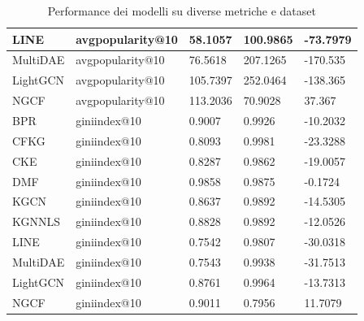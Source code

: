 \begin{table}[H]
\begin{tabular}{|l|l|l|l|l|}
    LINE             & avgpopularity@10 & 58.1057                       & 100.9865                        & -73.7979                              \\ \hline
    MultiDAE         & avgpopularity@10 & 76.5618                       & 207.1265                        & -170.535                              \\ \hline
    LightGCN         & avgpopularity@10 & 105.7397                      & 252.0464                        & -138.365                              \\ \hline
    NGCF             & avgpopularity@10 & 113.2036                      & 70.9028                         & 37.367                                \\ \hline
    BPR              & giniindex@10     & 0.9007                        & 0.9926                          & -10.2032                              \\ \hline
    CFKG             & giniindex@10     & 0.8093                        & 0.9981                          & -23.3288                              \\ \hline
    CKE              & giniindex@10     & 0.8287                        & 0.9862                          & -19.0057                              \\ \hline
    DMF              & giniindex@10     & 0.9858                        & 0.9875                          & -0.1724                               \\ \hline
    KGCN             & giniindex@10     & 0.8637                        & 0.9892                          & -14.5305                              \\ \hline
    KGNNLS           & giniindex@10     & 0.8828                        & 0.9892                          & -12.0526                              \\ \hline
    LINE             & giniindex@10     & 0.7542                        & 0.9807                          & -30.0318                              \\ \hline
    MultiDAE         & giniindex@10     & 0.7543                        & 0.9938                          & -31.7513                              \\ \hline
    LightGCN         & giniindex@10     & 0.8761                        & 0.9964                          & -13.7313                              \\ \hline
    NGCF             & giniindex@10     & 0.9011                        & 0.7956                          & 11.7079                               \\ \hline
    \end{tabular}
    \caption{Performance dei modelli su diverse metriche e dataset}
    \label{tab:my-table}
    \end{table}


